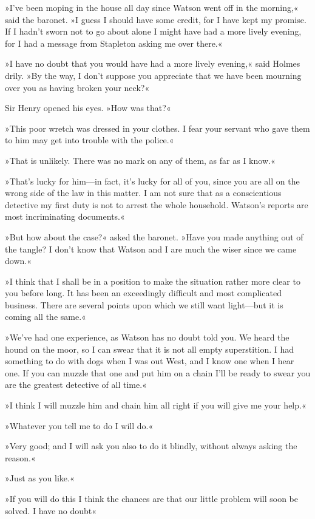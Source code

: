 »I've been moping in the house all day since Watson went off in the morning,« said the baronet. »I guess I should have some credit, for I have kept my promise. If I hadn't sworn not to go about alone I might have had a more lively evening, for I had a message from Stapleton asking me over there.«

»I have no doubt that you would have had a more lively evening,« said Holmes drily. »By the way, I don't suppose you appreciate that we have been mourning over you as having broken your neck?«

Sir Henry opened his eyes. »How was that?«

»This poor wretch was dressed in your clothes. I fear your servant who gave them to him may get into trouble with the police.«

»That is unlikely. There was no mark on any of them, as far as I know.«

»That's lucky for him\allowbreak---\allowbreak in fact, it's lucky for all of you, since you are all on the wrong side of the law in this matter. I am not sure that as a conscientious detective my first duty is not to arrest the whole household. Watson's reports are most incriminating documents.«

»But how about the case?« asked the baronet. »Have you made anything out of the tangle? I don't know that Watson and I are much the wiser since we came down.«

»I think that I shall be in a position to make the situation rather more clear to you before long. It has been an exceedingly difficult and most complicated business. There are several points upon which we still want light\allowbreak---\allowbreak but it is coming all the same.«

»We've had one experience, as Watson has no doubt told you. We heard the hound on the moor, so I can swear that it is not all empty superstition. I had something to do with dogs when I was out West, and I know one when I hear one. If you can muzzle that one and put him on a chain I'll be ready to swear you are the greatest detective of all time.«

»I think I will muzzle him and chain him all right if you will give me your help.«

»Whatever you tell me to do I will do.«

»Very good; and I will ask you also to do it blindly, without always asking the reason.«

»Just as you like.«

»If you will do this I think the chances are that our little problem will soon be solved. I have no doubt\longdash «

